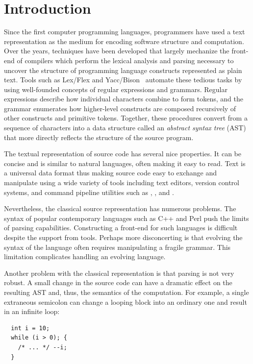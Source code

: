 \documentclass{article}
\begin{document}
\section{Introduction}
\label{sec-intro}

Since the first computer programming languages, programmers have used 
a text representation
as the medium for encoding software structure and
computation.  Over the years, techniques have been developed that
largely mechanize the front-end of compilers which perform the lexical
analysis and parsing necessary to uncover the structure of programming
language constructs represented as plain text.  Tools such as Lex/Flex
and Yacc/Bison~\cite{Levine92} automate these tedious tasks
by using well-founded concepts of regular expressions and
grammars. Regular expressions describe how individual characters combine
to form tokens, and the grammar enumerates how higher-level constructs
are composed recursively of other constructs and primitive tokens.  Together, these
procedures convert from a sequence of characters into a data structure
called an \emph{abstract syntax tree} (AST) that more directly
reflects the structure of the source program.

The textual representation of source code has several nice properties.
It can be concise and is similar to natural languages, often making
it easy to read.  Text is a universal data format thus making source
code easy to exchange and manipulate using a wide variety of tools
including text editors, version control systems, and command pipeline
utilities such as , , and
.

Nevertheless, the classical source representation has numerous 
problems.  The syntax of popular contemporary
languages such as C++ and Perl push the limits of parsing capabilities.
Constructing a front-end
for such languages is difficult despite the support from 
tools.  Perhaps more disconcerting is that evolving the syntax of the
language often requires manipulating a fragile grammar.  This limitation
complicates handling an evolving language.

Another problem with the classical representation is that parsing is not very
robust.  A small change in the source code can have a dramatic effect on
the resulting AST and, thus, the semantics of the computation.  For
example, a single extraneous semicolon can change a looping block into
an ordinary one and result in an infinite loop:

\begin{verbatim}
  int i = 10;
  while (i > 0); {
    /* ... */ --i;
  }
\end{verbatim}
\end{document}
